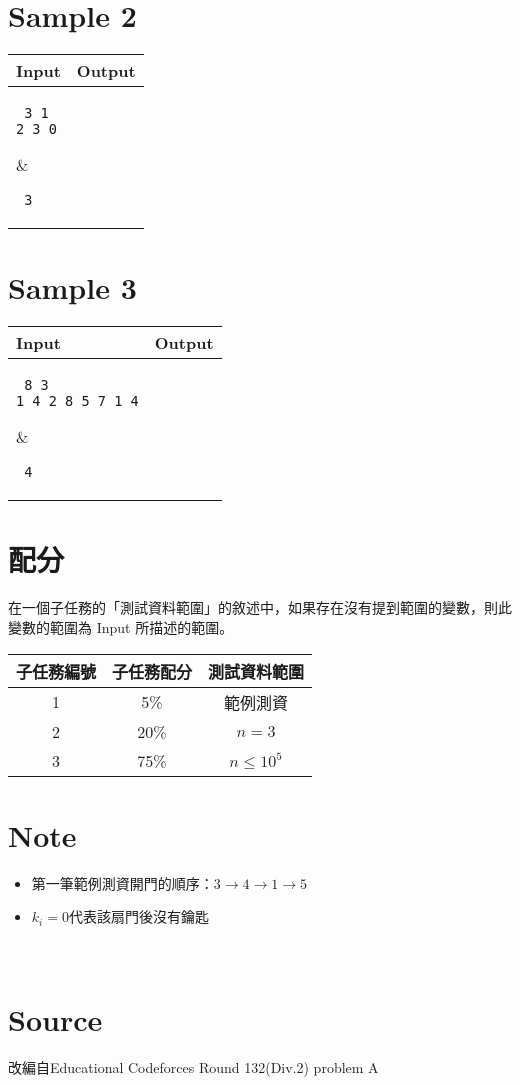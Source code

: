 \documentclass[11pt,a4paper]{article}
\begin{document}
\section*{Sample 2}
\begin{longtable}[!h]{|p{}|p{}|}
\hline
\textbf {Input}	& \textbf {Output} \\
\hline
\parbox[t]{0.5\textwidth} %
{ \tt
3 1\\
2 3 0\\
} &
\parbox[t]{0.5\textwidth}
{ \tt
3\\
} \\
\hline
\end{longtable}

\section*{Sample 3}
\begin{longtable}[!h]{|p{}|p{}|}
\hline
\textbf {Input}	& \textbf {Output} \\
\hline
\parbox[t]{0.5\textwidth} %
{ \tt
8 3\\
1 4 2 8 5 7 1 4\\
} &
\parbox[t]{0.5\textwidth}
{ \tt
4\\
} \\
\hline
\end{longtable}

\section*{配分}

在一個子任務的「測試資料範圍」的敘述中，如果存在沒有提到範圍的變數，則此變數的範圍為 Input 所描述的範圍。

\begin{center}
 \begin{tabular}{||c c c||} 
 \hline
 子任務編號 & 子任務配分 & 測試資料範圍 \\  
 \hline
 \hline
 1 & 5\% & 範例測資 \\ 
 \hline
 2 & 20\% & $n=3$ \\
 \hline 
 3 & 75\% & $n\le 10^5$ \\
 \hline
\end{tabular}
\end{center}

\section*{Note}

\begin{itemize}
    \item 第一筆範例測資開門的順序：$3\rightarrow 4\rightarrow 1\rightarrow 5$
    \item $k_i=0$代表該扇門後沒有鑰匙

\end{itemize}\

\section*{Source}

改編自Educational Codeforces Round 132(Div.2) problem A
\end{document}
